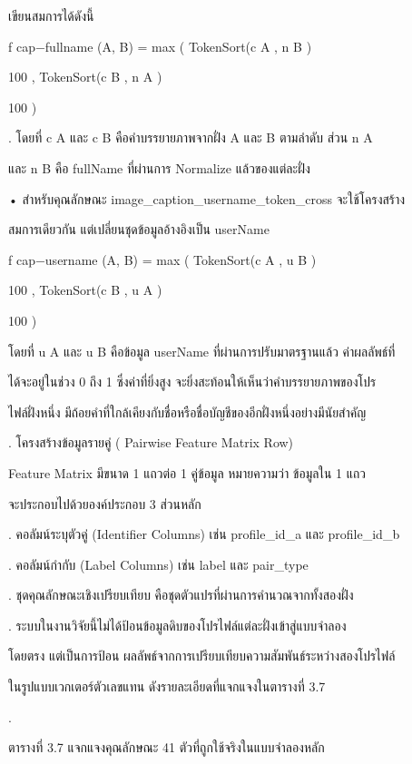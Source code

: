 \documentclass[12pt,a4paper]{report}
\begin{document}
เขียนสมการได้ดังนี้\par
\clearpage
f cap−fullname (A, B) = max ( TokenSort(c A , n B )\par
100 , TokenSort(c B , n A )\par
100 )\par
{}. โดยที่ c A และ c B คือคำบรรยายภาพจากฝั่ง A และ B ตามลำดับ ส่วน n A\par
และ n B คือ fullName ที่ผ่านการ Normalize แล้วของแต่ละฝั่ง\par
\noindent • สำหรับคุณลักษณะ image\_caption\_username\_token\_cross จะใช้โครงสร้าง\par
สมการเดียวกัน แต่เปลี่ยนชุดข้อมูลอ้างอิงเป็น userName\par
f cap−username (A, B) = max ( TokenSort(c A , u B )\par
100 , TokenSort(c B , u A )\par
100 )\par
โดยที่ u A และ u B คือข้อมูล userName ที่ผ่านการปรับมาตรฐานแล้ว ค่าผลลัพธ์ที่\par
ได้จะอยู่ในช่วง 0 ถึง 1 ซึ่งค่าที่ยิ่งสูง จะยิ่งสะท้อนให้เห็นว่าคำบรรยายภาพของโปร\par
ไฟล์ฝั่งหนึ่ง มีถ้อยคำที่ใกล้เคียงกับชื่อหรือชื่อบัญชีของอีกฝั่งหนึ่งอย่างมีนัยสำคัญ\par
{}. โครงสร้างข้อมูลรายคู่ ( Pairwise Feature Matrix Row)\par
Feature Matrix มีขนาด 1 แถวต่อ 1 คู่ข้อมูล หมายความว่า ข้อมูลใน 1 แถว\par
จะประกอบไปด้วยองค์ประกอบ 3 ส่วนหลัก\par
{}. คอลัมน์ระบุตัวคู่ (Identifier Columns) เช่น profile\_id\_a และ profile\_id\_b\par
{}. คอลัมน์กำกับ (Label Columns) เช่น label และ pair\_type\par
{}. ชุดคุณลักษณะเชิงเปรียบเทียบ คือชุดตัวแปรที่ผ่านการคำนวณจากทั้งสองฝั่ง\par
{}. ระบบในงานวิจัยนี้ไม่ได้ป้อนข้อมูลดิบของโปรไฟล์แต่ละฝั่งเข้าสู่แบบจำลอง\par
โดยตรง แต่เป็นการป้อน ผลลัพธ์จากการเปรียบเทียบความสัมพันธ์ระหว่างสองโปรไฟล์\par
ในรูปแบบเวกเตอร์ตัวเลขแทน ดังรายละเอียดที่แจกแจงในตารางที่ 3.7\par
{}.\par
\clearpage
\begin{center}\small ตารางที่ 3.7 แจกแจงคุณลักษณะ 41 ตัวที่ถูกใช้จริงในแบบจำลองหลัก\end{center}
\end{document}
